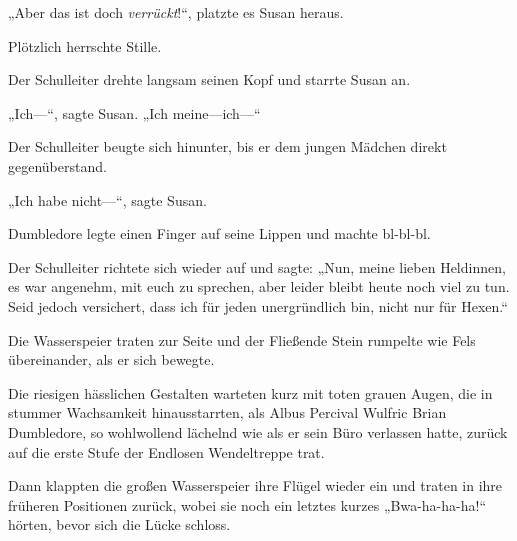 „Aber das ist doch \emph{verrückt}!“, platzte es Susan heraus.

Plötzlich herrschte Stille.

Der Schulleiter drehte langsam seinen Kopf und starrte Susan an.

„Ich—“, sagte Susan. „Ich meine—ich—“

Der Schulleiter beugte sich hinunter, bis er dem jungen Mädchen direkt gegenüberstand.

„Ich habe nicht—“, sagte Susan.

Dumbledore legte einen Finger auf seine Lippen und machte bl-bl-bl.

Der Schulleiter richtete sich wieder auf und sagte: „Nun, meine lieben Heldinnen, es war angenehm, mit euch zu sprechen, aber leider bleibt heute noch viel zu tun. Seid jedoch versichert, dass ich für jeden unergründlich bin, nicht nur für Hexen.“

Die Wasserspeier traten zur Seite und der Fließende Stein rumpelte wie Fels übereinander, als er sich bewegte.

Die riesigen hässlichen Gestalten warteten kurz mit toten grauen Augen, die in stummer Wachsamkeit hinausstarrten, als Albus Percival Wulfric Brian Dumbledore, so wohlwollend lächelnd wie als er sein Büro verlassen hatte, zurück auf die erste Stufe der Endlosen Wendeltreppe trat.

Dann klappten die großen Wasserspeier ihre Flügel wieder ein und traten in ihre früheren Positionen zurück, wobei sie noch ein letztes kurzes „Bwa-ha-ha-ha!“ hörten, bevor sich die Lücke schloss.

